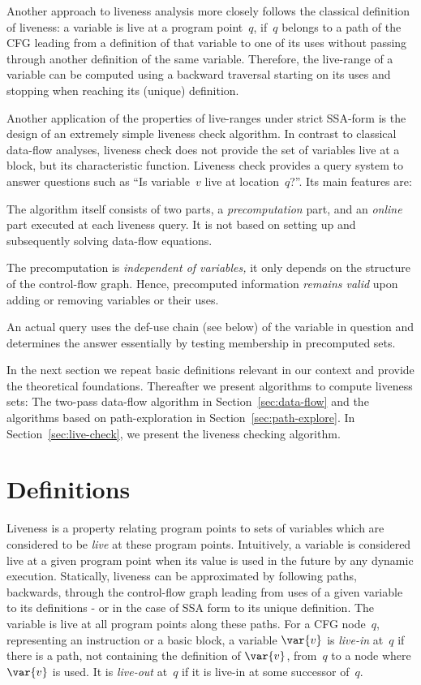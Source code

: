 Another approach to liveness analysis more closely follows the classical definition of liveness:
a variable is live at a program point~$q$, if~$q$ belongs to a path of the CFG leading from a definition of that variable to one of its uses without passing through another definition of the same variable.
Therefore, the live-range of a variable can be computed using a backward traversal starting on its uses and stopping when reaching its (unique) definition.

Another application of the properties of live-ranges under strict SSA-form is the design of an extremely simple liveness check algorithm.
In contrast to classical data-flow analyses, liveness check does not provide the set of variables live at a block, but its characteristic function.
Liveness check provides a query system to answer questions such as ``Is variable~$v$ live at location~$q$?''.
Its main features are:
\begin{compactenum}
\item
	The algorithm itself consists of two parts, a \emph{precomputation} part, and an \emph{online} part executed at each liveness query.
	It is not based on setting up and subsequently solving data-flow equations.
\item
	The precomputation is \emph{independent of variables,} it only depends on the structure of the control-flow graph.
	Hence, precomputed information \emph{remains valid} upon adding or removing variables or their uses.
\item
	An actual query uses the def-use chain (see below) of the variable in question and determines the answer essentially by testing membership in precomputed sets.
\end{compactenum}

In the next section we repeat basic definitions relevant in our context and provide the theoretical foundations.
Thereafter we present algorithms to compute liveness sets:
The two-pass data-flow algorithm in Section~\ref{sec:data-flow} and the algorithms based on path-exploration in Section~\ref{sec:path-explore}.
In Section~\ref{sec:live-check}, we present the liveness checking algorithm.


\section{Definitions}
Liveness is a property relating program points to sets of variables which are considered to be \emph{live} at these program points.
Intuitively, a variable is considered live at a given program point when its value is used in the future by any dynamic execution.
Statically, liveness can be approximated by following paths, backwards, through the control-flow graph leading from uses of a given variable to its definitions - or in the case of SSA form to its unique definition.
The variable is live at all program points along these paths.
For a CFG node~$q$, representing an instruction or a basic block, a variable $\var{v}$ is \emph{live-in} at~$q$ if there is a path, not containing the definition of $\var{v}$, from~$q$ to a node where $\var{v}$ is used.
It is \emph{live-out} at~$q$ if it is live-in at some successor of~$q$.

